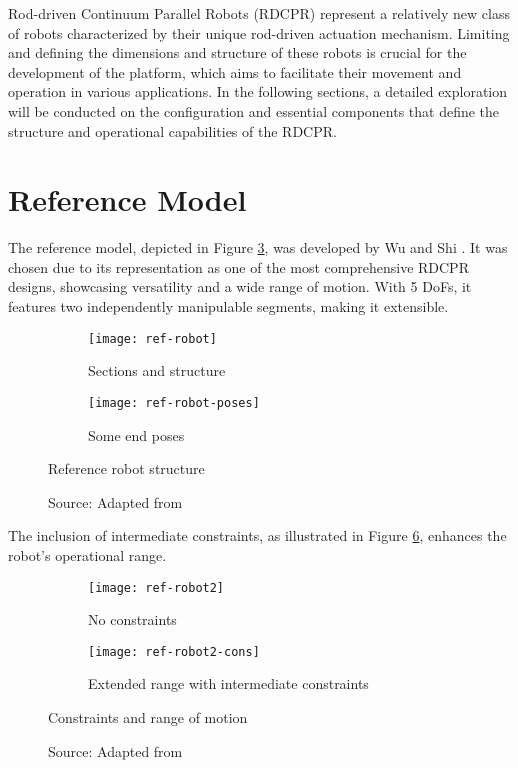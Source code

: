 Rod-driven Continuum Parallel Robots (RDCPR) represent a relatively new class of robots characterized by their unique rod-driven actuation mechanism. Limiting and defining the dimensions and structure of these robots is crucial for the development of the platform, which aims to facilitate their movement and operation in various applications. In the following sections, a detailed exploration will be conducted on the configuration and essential components that define the structure and operational capabilities of the RDCPR.

\section{Reference Model}

The reference model, depicted in Figure \ref{fig:ref-robot}, was developed by Wu and Shi \cite{wu2022}. It was chosen due to its representation as one of the most comprehensive RDCPR designs, showcasing versatility and a wide range of motion. With 5 DoFs, it features two independently manipulable segments, making it extensible.

\begin{figure}[H]
    \centering
    \begin{subfigure}[t]{0.3\textwidth}
        \texttt{[image: ref-robot]}
        \caption{Sections and structure}
        \label{fig:ref-robot-structure}
    \end{subfigure}
    \begin{subfigure}[t]{0.3\textwidth}
        \texttt{[image: ref-robot-poses]}
        \caption{Some end poses}
        \label{fig:ref-robot-poses}
    \end{subfigure}
    \caption{Reference robot structure}
    \caption*{Source: Adapted from \cite{wu2022}}
    \label{fig:ref-robot}
\end{figure}

The inclusion of intermediate constraints, as illustrated in Figure \ref{fig:ref-robot2-constraints}, enhances the robot's operational range.

\begin{figure}[H]
    \centering
    \begin{subfigure}[t]{0.257\textwidth}
        \texttt{[image: ref-robot2]}
        \caption{No constraints}
        \label{fig:ref-robot2}
    \end{subfigure}
    \begin{subfigure}[t]{0.643\textwidth}
        \texttt{[image: ref-robot2-cons]}
        \caption{Extended range with intermediate constraints}
        \label{fig:ref-robot2-cons}
    \end{subfigure}
    \caption{Constraints and range of motion}
    \caption*{Source: Adapted from \cite{orekhov2017}}
    \label{fig:ref-robot2-constraints}
\end{figure}

